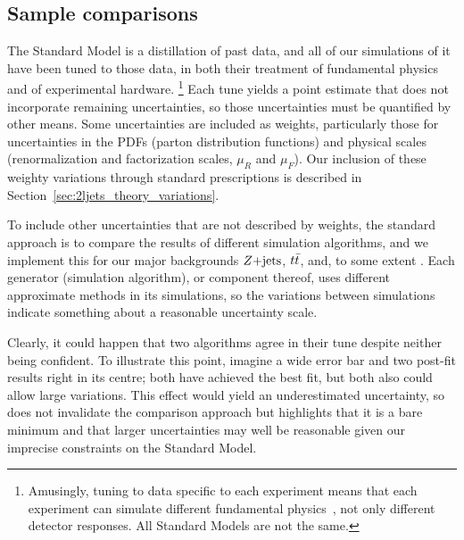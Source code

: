 \subsection{Sample comparisons}
\label{sec:2ljets_sample_comparisons}
The Standard Model is a distillation of past data, and all of our simulations
of it have been tuned to those data, in both their treatment of fundamental
physics and of experimental hardware.%
\footnote{%
Amusingly, tuning to data specific to each experiment means that each
experiment can simulate different fundamental physics~\cite{
herwig2000parameter,
Altarelli:473529
}, not only different detector responses.
All Standard Models are not the same.
}
Each tune yields a point estimate that does not incorporate remaining
uncertainties, so those uncertainties must be quantified by other means.
Some uncertainties are included as weights, particularly those for
uncertainties in the
PDFs (parton distribution functions) and physical scales
(renormalization and factorization scales, $\mu_R$ and $\mu_F$).
Our inclusion of these weighty variations through standard prescriptions is
described in Section~\ref{sec:2ljets_theory_variations}.

To include other uncertainties that are not described by weights,
the standard approach is to compare the results of different simulation
algorithms, and we implement this for our major backgrounds $Z\mathrm{+jets}$, $t\bar t$,
and, to some extent \diboson.
Each generator (simulation algorithm), or component thereof, uses different
approximate methods in its simulations, so the variations between simulations
indicate something about a reasonable uncertainty scale.

Clearly, it could happen that two algorithms agree in their tune despite
neither being confident.
To illustrate this point, imagine a wide error bar and
two post-fit results right in its centre;
both have achieved the best fit, but both also could allow large variations.
This effect would yield an underestimated uncertainty, so does not invalidate
the comparison approach but highlights that it is a bare minimum and that
larger uncertainties may well be reasonable given our imprecise constraints on
the Standard Model.

